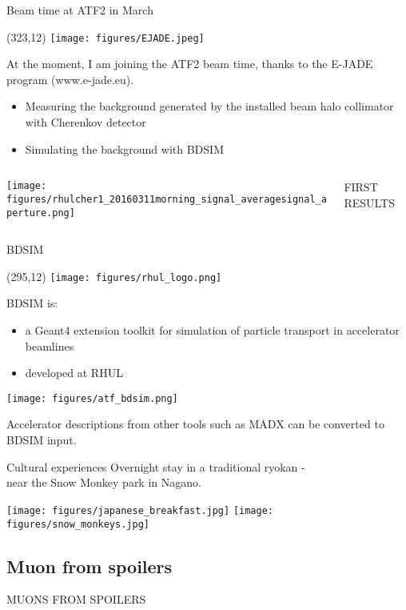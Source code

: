 \documentclass[xcolor={dvipsnames}]{beamer}
\newcommand{\rhullogo}{
  \setlength{\TPHorizModule}{1pt}
  \setlength{\TPVertModule}{1pt}
  \begin{textblock}{1}(295,12)
   \texttt{[image: figures/rhul\_logo.png]}
  \end{textblock}
}
\newcommand{\ejadelogo}{
  \setlength{\TPHorizModule}{1pt}
  \setlength{\TPVertModule}{1pt}
  \begin{textblock}{1}(323,12)
   \texttt{[image: figures/EJADE.jpeg]}
  \end{textblock}
}
\begin{document}
\begin{frame}{Beam time at ATF2 in March}
\ejadelogo
At the moment, I am joining the ATF2 beam time, thanks to the E-JADE program {\tiny(www.e-jade.eu)}.
\begin{itemize}
\item Measuring the background generated by the installed beam halo collimator with Cherenkov detector
\item Simulating the background with BDSIM
\end{itemize}
\begin{columns}[T]
 \begin{column}[t]{0.75\textwidth}
 \flushright
  \texttt{[image: figures/rhulcher1\_20160311morning\_signal\_averagesignal\_aperture.png]}
 \end{column}
 \begin{column}[t]{0.25\textwidth}
  \flushleft
  \textcolor{RubineRed}{FIRST RESULTS}
 \end{column}
\end{columns}
\end{frame}

\begin{frame}{BDSIM}
\rhullogo
BDSIM is:
\begin{itemize}
 \item a Geant4 extension toolkit for simulation of particle transport in accelerator beamlines
 \item developed at RHUL
\end{itemize}
 \begin{center}
 \texttt{[image: figures/atf\_bdsim.png]}
\end{center}
Accelerator descriptions from other tools such as MADX can be converted to BDSIM input. 
\end{frame}


\begin{frame}{Cultural experiences}
Overnight stay in a traditional ryokan - \\ \flushright near the Snow Monkey park in Nagano.
 \begin{center}
 \texttt{[image: figures/japanese\_breakfast.jpg]}
 \hspace*{0.3cm}
 \texttt{[image: figures/snow\_monkeys.jpg]}
\end{center}
\end{frame}


\subsection{Muon from spoilers}
\begin{frame}
 \begin{center}
  \alert{\MakeUppercase{Muons from spoilers}}
 \end{center}
\end{frame}
\end{document}
